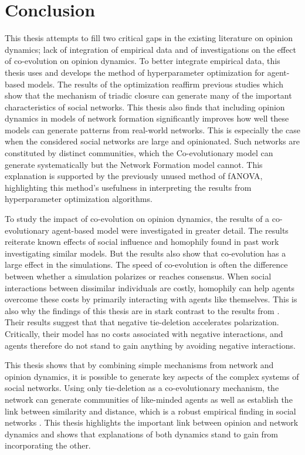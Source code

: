 \documentclass[11pt]{article}
\begin{document}
\section{Conclusion}
This thesis attempts to fill two critical gaps in the existing literature on opinion dynamics; lack of integration of empirical data and of investigations on the effect of co-evolution on opinion dynamics. To better integrate empirical data, this thesis uses and develops the method of hyperparameter optimization for agent-based models. The results of the optimization reaffirm previous studies which show that the mechanism of triadic closure can generate many of the important characteristics of social networks. This thesis also finds that including opinion dynamics in models of network formation significantly improves how well these models can generate patterns from real-world networks. This is especially the case when the considered social networks are large and opinionated. Such networks are constituted by distinct communities, which the Co-evolutionary model can generate systematically but the Network Formation model cannot. This explanation is supported by the previously unused method of fANOVA, highlighting this method's usefulness in interpreting the results from hyperparameter optimization algorithms.

\noindent To study the impact of co-evolution on opinion dynamics, the results of a co-evolutionary agent-based model were investigated in greater detail. The results reiterate known effects of social influence and homophily found in past work investigating similar models. But the results also show that co-evolution has a large effect in the simulations. The speed of co-evolution is often the difference between whether a simulation polarizes or reaches consensus. When social interactions between dissimilar individuals are costly, homophily can help agents overcome these costs by primarily interacting with agents like themselves. This is also why the findings of this thesis are in stark contrast to the results from . Their results suggest that that negative tie-deletion accelerates polarization. Critically, their model has no costs associated with negative interactions, and agents therefore do not stand to gain anything by avoiding negative interactions. 

\noindent This thesis shows that by combining simple mechanisms from network and opinion dynamics, it is possible to generate key aspects of the complex systems of social networks. Using only tie-deletion as a co-evolutionary mechanism, the network can generate communities of like-minded agents as well as establish the link between similarity and distance, which is a robust empirical finding in social networks \cite{kossinets_origins_2009}.
This thesis highlights the important link between opinion and network dynamics and shows that explanations of both dynamics stand to gain from incorporating the other. 
\end{document}
